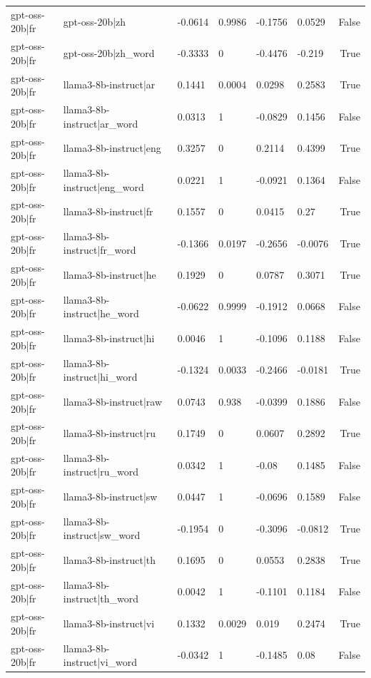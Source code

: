 \begin{table}
\begin{tabular}{llllllr}
gpt-oss-20b|fr & gpt-oss-20b|zh & -0.0614 & 0.9986 & -0.1756 & 0.0529 & False \\
gpt-oss-20b|fr & gpt-oss-20b|zh_word & -0.3333 & 0 & -0.4476 & -0.219 & True \\
gpt-oss-20b|fr & llama3-8b-instruct|ar & 0.1441 & 0.0004 & 0.0298 & 0.2583 & True \\
gpt-oss-20b|fr & llama3-8b-instruct|ar_word & 0.0313 & 1 & -0.0829 & 0.1456 & False \\
gpt-oss-20b|fr & llama3-8b-instruct|eng & 0.3257 & 0 & 0.2114 & 0.4399 & True \\
gpt-oss-20b|fr & llama3-8b-instruct|eng_word & 0.0221 & 1 & -0.0921 & 0.1364 & False \\
gpt-oss-20b|fr & llama3-8b-instruct|fr & 0.1557 & 0 & 0.0415 & 0.27 & True \\
gpt-oss-20b|fr & llama3-8b-instruct|fr_word & -0.1366 & 0.0197 & -0.2656 & -0.0076 & True \\
gpt-oss-20b|fr & llama3-8b-instruct|he & 0.1929 & 0 & 0.0787 & 0.3071 & True \\
gpt-oss-20b|fr & llama3-8b-instruct|he_word & -0.0622 & 0.9999 & -0.1912 & 0.0668 & False \\
gpt-oss-20b|fr & llama3-8b-instruct|hi & 0.0046 & 1 & -0.1096 & 0.1188 & False \\
gpt-oss-20b|fr & llama3-8b-instruct|hi_word & -0.1324 & 0.0033 & -0.2466 & -0.0181 & True \\
gpt-oss-20b|fr & llama3-8b-instruct|raw & 0.0743 & 0.938 & -0.0399 & 0.1886 & False \\
gpt-oss-20b|fr & llama3-8b-instruct|ru & 0.1749 & 0 & 0.0607 & 0.2892 & True \\
gpt-oss-20b|fr & llama3-8b-instruct|ru_word & 0.0342 & 1 & -0.08 & 0.1485 & False \\
gpt-oss-20b|fr & llama3-8b-instruct|sw & 0.0447 & 1 & -0.0696 & 0.1589 & False \\
gpt-oss-20b|fr & llama3-8b-instruct|sw_word & -0.1954 & 0 & -0.3096 & -0.0812 & True \\
gpt-oss-20b|fr & llama3-8b-instruct|th & 0.1695 & 0 & 0.0553 & 0.2838 & True \\
gpt-oss-20b|fr & llama3-8b-instruct|th_word & 0.0042 & 1 & -0.1101 & 0.1184 & False \\
gpt-oss-20b|fr & llama3-8b-instruct|vi & 0.1332 & 0.0029 & 0.019 & 0.2474 & True \\
gpt-oss-20b|fr & llama3-8b-instruct|vi_word & -0.0342 & 1 & -0.1485 & 0.08 & False \\

\end{tabular}
\end{table}
